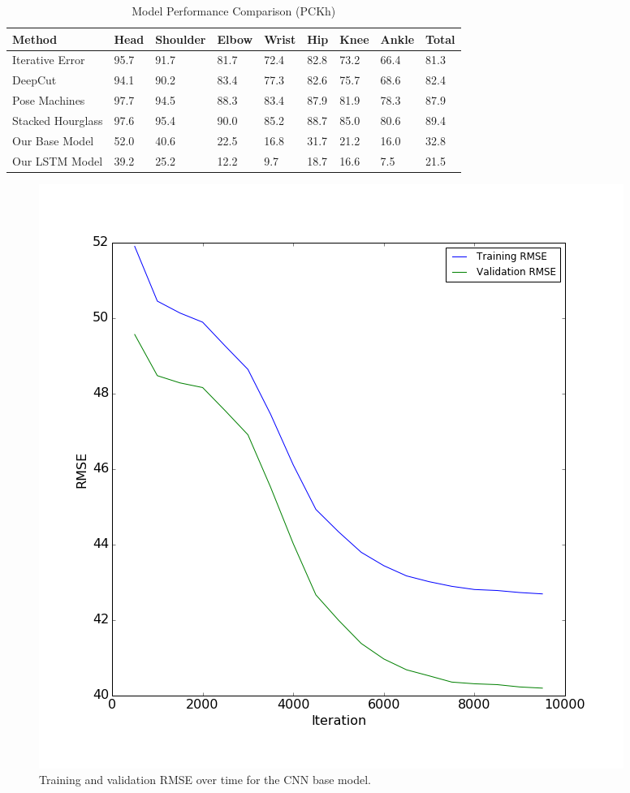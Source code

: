\documentclass[11pt,twocolumn,letterpaper]{article}
\begin{document}
\begin{table}
\centering
\begin{tabular}{l l l l l l l l l}
\hline \hline
Method & Head & Shoulder & Elbow & Wrist & Hip & Knee & Ankle & Total\\
\hline
Iterative Error\cite{carreira2015human} & 95.7 & 91.7 & 81.7 & 72.4 & 82.8 & 73.2 & 66.4 & 81.3\\
DeepCut\cite{pishchulin2015deepcut} & 94.1 & 90.2 & 83.4 & 77.3 & 82.6 & 75.7 & 68.6 & 82.4\\
Pose Machines\cite{wei2016convolutional} & 97.7 & 94.5 & 88.3 & 83.4 & 87.9 & 81.9 & 78.3 & 87.9\\
Stacked Hourglass\cite{newell2016stacked} & 97.6 & 95.4 & 90.0 & 85.2 & 88.7 & 85.0 & 80.6 & 89.4\\
\hline
Our Base Model & 52.0 & 40.6 & 22.5 & 16.8 & 31.7 & 21.2 & 16.0 & 32.8\\
Our LSTM Model & 39.2 & 25.2 & 12.2 & 9.7 & 18.7 & 16.6 & 7.5 & 21.5 \\
\hline \hline
\end{tabular}
\caption{Model Performance Comparison (PCKh)}
\end{table}

\begin{figure}[!ht]
\begin{center}
\includegraphics[scale=0.35]{images/base_loss}
\end{center}
\caption{Training and validation RMSE over time for the CNN base model.}
\label{fig:1}

\end{figure}
\end{document}
